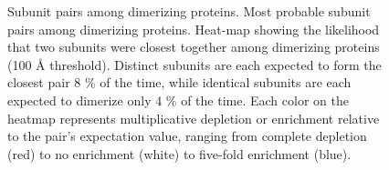 


\begin{figure}[htp]
\begin{flushleft}
\caption[Subunit pairs among dimerizing proteins.] {Subunit pairs among dimerizing proteins. Most probable subunit pairs among dimerizing proteins. Heat-map showing the likelihood that two subunits were closest together among dimerizing proteins (100 {\AA} threshold). Distinct subunits are each expected to form the closest pair 8 \% of the time, while identical subunits are each expected to dimerize only 4 \% of the time. Each color on the heatmap represents multiplicative depletion or enrichment relative to the pair's expectation value, ranging from complete depletion (red) to no enrichment (white) to five-fold enrichment (blue).} 
\end{flushleft}

\label{fig:Figure7}
\end{figure}

